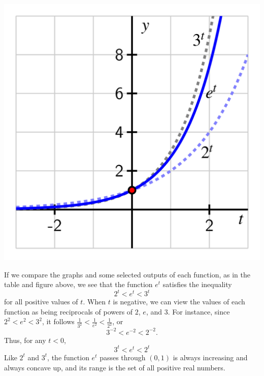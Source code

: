 \documentclass[nooutcomes]{ximera}
\begin{document}

\begin{image}
\includegraphics{e-2-e-3.jpg}
\end{image}

If we compare the graphs and some selected outputs of each function, as in the table and figure above, we see that the function $e^t$ satisfies the inequality%
\begin{equation*}
2^t < e^t < 3^t
\end{equation*}
for all positive values of $t$.  When $t$ is negative, we can view the values of each function as being reciprocals of powers of $2$, $e$, and $3$.  For instance, since $2^2 < e^2 < 3^2$, it follows $\frac{1}{3^2} < \frac{1}{e^2} < \frac{1}{2^2}$, or%
\begin{equation*}
3^{-2} < e^{-2} < 2^{-2}\text{.}
\end{equation*}
Thus, for any $t < 0$,%
\begin{equation*}
3^t < e^t < 2^t
\end{equation*}
Like $2^t$ and $3^t$, the function $e^t$ passes through $(0,1)$ is always increasing and always concave up, and its range is the set of all positive real numbers.
\end{document}
